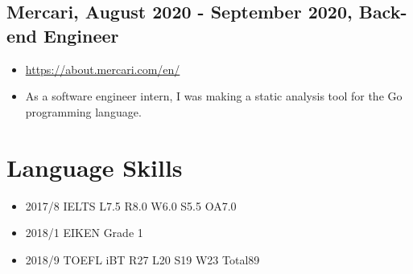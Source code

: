 \documentclass{article}
\begin{document}
  \subsection*{Mercari, August 2020 - September 2020, Back-end Engineer}
    \begin{itemize}
      \item \url{https://about.mercari.com/en/}
      \item As a software engineer intern, I was making a static analysis tool for the Go programming language.
    \end{itemize}

\section*{Language Skills}
  \begin{itemize}
    \item 2017/8 IELTS L7.5 R8.0 W6.0 S5.5 OA7.0
    \item 2018/1 EIKEN Grade 1
    \item 2018/9 TOEFL iBT R27 L20 S19 W23 Total89
  \end{itemize}
\end{document}
